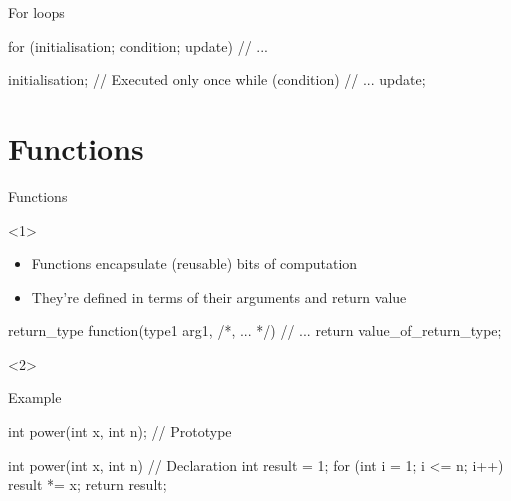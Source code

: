 \begin{frame}[fragile]{For loops}
    \vspace{0.5em}
    \begin{cpp}
        for (initialisation; condition; update)
        {
            // ...
        }
    \end{cpp}
    \vspace{-2.5em}
    \begin{cpp}
        initialisation; // Executed only once
        while (condition)
        {
            // ...
            update;
        }
    \end{cpp}
\end{frame}

\section{Functions}

\begin{frame}[fragile]{Functions}
    \begin{onlyenv}<1>
        \begin{itemize}
            \item Functions encapsulate (reusable) bits of computation
            \item They're defined in terms of their arguments and return value
        \end{itemize}
        \begin{cpp}
            return_type function(type1 arg1, /*, ... */)
            {
                // ...
                return value_of_return_type;
            }
        \end{cpp}
    \end{onlyenv}
    \begin{onlyenv}<2>
        \begin{block}{Example}
            \begin{cpp}
                int power(int x, int n); // Prototype

                int power(int x, int n)  // Declaration
                {
                    int result = 1;
                    for (int i = 1; i <= n; i++)
                    {
                        result *= x;
                    }
                    return result;
                }
            \end{cpp}
        \end{block}
    \end{onlyenv}
\end{frame}

